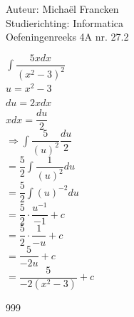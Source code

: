 \documentclass[a4paper]{article}
\newcommand{\dint}{\displaystyle\int}
\begin{document}
\noindent \large Auteur: Michaël Francken \\
\noindent \large Studierichting: Informatica\\
\noindent \large Oefeningenreeks 4A nr. 27.2\\

\medskip

\normalsize

$\dint\dfrac{5xdx}{(x^2-3)^2}$\\


$u = x^2-3$\\

$du = 2xdx$\\

$xdx=\dfrac{du}{2}$\\

$\Rightarrow \dint\dfrac{5}{(u)^2}\dfrac{du}{2}$\\

$=\dfrac{5}{2}\dint\dfrac{1}{(u)^2}du$\\

$=\dfrac{5}{2}\dint(u)^{-2} du$\\

$=\dfrac{5}{2}\cdot\dfrac{u^{-1}}{-1}+c$\\

$=\dfrac{5}{2}\cdot\dfrac{1}{-u}+c$\\

$=\dfrac{5}{-2u}+c$\\

$=\dfrac{5}{-2(x^2-3)}+c$\\

\begin{thebibliography}{999}
\end{thebibliography}
\end{document}
